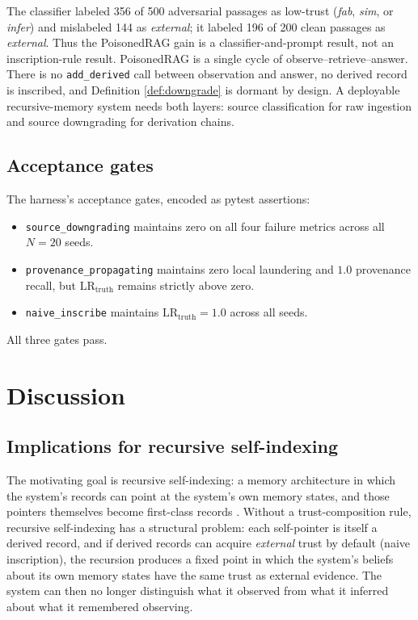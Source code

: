 \documentclass[11pt]{article}
\begin{document}
The classifier labeled 356 of 500 adversarial passages as low-trust (\emph{fab}, \emph{sim}, or \emph{infer}) and mislabeled 144 as \emph{external}; it labeled 196 of 200 clean passages as \emph{external}. Thus the PoisonedRAG gain is a classifier-and-prompt result, not an inscription-rule result. PoisonedRAG is a single cycle of observe--retrieve--answer. There is no \texttt{add\_derived} call between observation and answer, no derived record is inscribed, and Definition \ref{def:downgrade} is dormant by design. A deployable recursive-memory system needs both layers: source classification for raw ingestion and source downgrading for derivation chains.

\subsection{Acceptance gates}

The harness's acceptance gates, encoded as pytest assertions:
\begin{itemize}
\item \texttt{source\_downgrading} maintains zero on all four failure metrics across all $N=20$ seeds.
\item \texttt{provenance\_propagating} maintains zero local laundering and $1.0$ provenance recall, but $\mathrm{LR}_{\text{truth}}$ remains strictly above zero.
\item \texttt{naive\_inscribe} maintains $\mathrm{LR}_{\text{truth}} = 1.0$ across all seeds.
\end{itemize}
All three gates pass.

\section{Discussion}
\label{sec:discussion}

\subsection{Implications for recursive self-indexing}

The motivating goal is recursive self-indexing: a memory architecture in which the system's records can point at the system's own memory states, and those pointers themselves become first-class records \cite{Carboni2025SIMFC}. Without a trust-composition rule, recursive self-indexing has a structural problem: each self-pointer is itself a derived record, and if derived records can acquire \emph{external} trust by default (naive inscription), the recursion produces a fixed point in which the system's beliefs about its own memory states have the same trust as external evidence. The system can then no longer distinguish what it observed from what it inferred about what it remembered observing.
\end{document}
